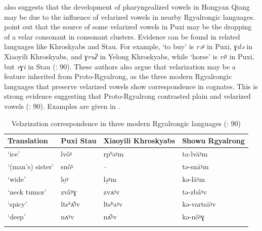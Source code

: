 \documentclass[output=paper]{langscibook}
\begin{document}
\begin{table}
\caption{Hongyan pharyngealized vowels corresponding to PTB *-w- \citep[114]{Evans2006a}}
\label{tab:guan:15}
\end{table}


\citet[119]{Evans2006a} also suggests that the development of pharyngealized vowels in Hongyan Qiang may be due to the influence of velarized vowels in nearby Rgyalrongic languages. \citet{LinEtAl2012} point out that the source of some velarized vowels in Puxi may be the dropping of a velar consonant in consonant clusters. Evidence can be found in related languages like Khroskyabs and Stau. For example, ‘to buy’ is \textit{rəˠ} in Puxi, \textit{ɣdə} in Xiaoyili Khroskyabs, and \textit{ɣruʔ} in Yelong Khroskyabs, while ‘horse’ is \textit{riˠ} in Puxi, but \textit{rɣi} in Stau (\citealt{LinEtAl2012}ː 90). These authors also argue that velarization may be a feature inherited from Proto-Rgyalrong, as the three modern Rgyalrongic languages that preserve velarized vowels show correspondence in cognates. This is strong evidence suggesting that Proto-Rgyalrong contrasted plain and velarized vowels (\citealt{LinEtAl2012}ː 90). Examples are given in .

\begin{table}
\caption{Velarization correspondence in three modern Rgyalrongic languages (\citealt{LinEtAl2012}: 90)}
\label{tab:guan:16}
\begin{tabularx}{\textwidth}{XXll}
\lsptoprule
Translation & Puxi Stau & Xiaoyili Khroskyabs & Showu Rgyalrong\\
\midrule
{‘ice’} & {lvôˠ} & {rpʰəˠm} & {ta-lvāˠm}\\
{‘(man’s) sister’} & {snôˠ} & {{}--} & {tə-snāˠm}\\
{‘wide’} & {lo̱ˠ} & {lə̱ˠm} & {kə-lāˠm}\\
{‘neck tumor’} & {zvâˠɣ} & {zvʌˠv} & {tə-zbâˠv}\\
{‘spicy’} & {ltsʰʌ̂ˠv} & {ltsʰaˠv} & {kə-vartsāˠv}\\
{‘deep’} & {nʌˠv} & {nʌ̂ˠv} & {kə-nôˠɣ}\\
\lspbottomrule
\end{tabularx}
\end{table}
\end{document}
